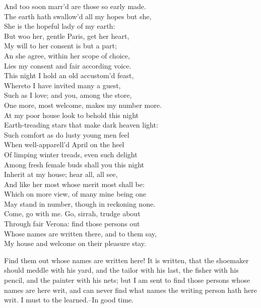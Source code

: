 \begin{speech}
And too soon marr'd are those so early made. \\
The earth hath swallow'd all my hopes but she, \\
She is the hopeful lady of my earth: \\
But woo her, gentle Paris, get her heart, \\
My will to her consent is but a part; \\
An she agree, within her scope of choice, \\
Lies my consent and fair according voice. \\
This night I hold an old accustom'd feast, \\
Whereto I have invited many a guest, \\
Such as I love; and you, among the store, \\
One more, most welcome, makes my number more. \\
At my poor house look to behold this night \\
Earth-treading stars that make dark heaven light: \\
Such comfort as do lusty young men feel \\
When well-apparell'd April on the heel \\
Of limping winter treads, even such delight \\
Among fresh female buds shall you this night \\
Inherit at my house; hear all, all see, \\
And like her most whose merit most shall be: \\
Which on more view, of many mine being one \\
May stand in number, though in reckoning none. \\
Come, go with me.  Go, sirrah, trudge about
\\
Through fair Verona: find those persons out \\
Whose names are written there, and to them say, \\
My house and welcome on their pleasure stay. 
\\
\end{speech}
\begin{speech}
Find them out whose names are written
here!   It is written, that the shoemaker
should meddle with his yard, and the tailor
with his last, the fisher with his pencil, and the
painter with his nets; but I am sent to find
those persons whose names are here writ, and
can never find what names the writing person
hath here writ. I must to the learned.--In good time. 
\end{speech}
